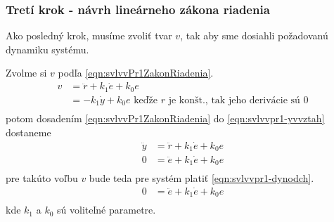 \documentclass[../main.tex]{subfiles}
\begin{document}
    \subsubsection{Tretí krok - návrh lineárneho zákona riadenia}
    Ako posledný krok, musíme zvoliť tvar $v$, tak aby sme dosiahli požadovanú dynamiku systému.
    
    Zvolme si $v$ podľa \cref{eqn:svlvvPr1ZakonRiadenia}.
	\begin{equation}
	\begin{aligned}
	 v &= \ddot{r}  +k_1 \dot{e} + k_0 e \\
	   &= -k_1 \dot{y} + k_0 e \text{ keďže $r$ je konšt., tak jeho derivácie sú 0}\\
	   \end{aligned}
	\label{eqn:svlvvPr1ZakonRiadenia}
	\end{equation}
    potom dosadením \cref{eqn:svlvvPr1ZakonRiadenia} do \cref{eqn:svlvvpr1-yvvztah} dostaneme 
	\begin{equation*}
	\begin{aligned}
	 \ddot{y} &= \ddot{r}  +k_1 \dot{e} + k_0 e \\
	 0 &= \ddot{e}  + k_1 \dot{e} + k_0 e \\
	\end{aligned}
	\end{equation*}
    pre takúto voľbu $v$ bude teda pre systém platiť \cref{eqn:svlvvpr1-dynodch}.
    \begin{equation}
        \begin{aligned}
	        0 &= \ddot{e}  + k_1 \dot{e} + k_0 e \\
        \end{aligned}
        \label{eqn:svlvvpr1-dynodch}
    \end{equation} 
    kde $k_1$ a $k_0$ sú voliteľné parametre. 
\end{document}
